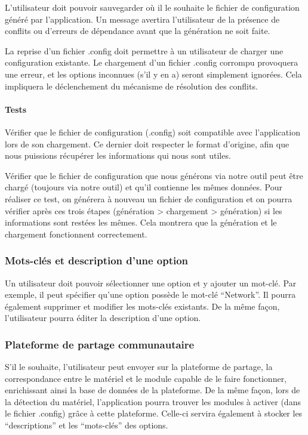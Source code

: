 \documentclass[16pts]{report}
\begin{document}
L’utilisateur doit pouvoir sauvegarder où il le souhaite le fichier de
configuration généré par l’application. Un message avertira l’utilisateur de la
présence de conflits ou d’erreurs de dépendance avant que la génération ne soit
faite.

La reprise d’un fichier .config doit permettre à un utilisateur de charger une
configuration existante. Le chargement d’un fichier .config corrompu provoquera
une erreur, et les options inconnues (s’il y en a) seront simplement ignorées.
Cela impliquera le déclenchement du mécanisme de résolution des conflits.

\paragraph{Tests}
\label{sub:Tests}

Vérifier que le fichier de configuration (.config) soit compatible avec
l’application lors de son chargement. Ce dernier doit respecter le format
d’origine, afin que nous puissions récupérer les informations qui nous sont
utiles.

Vérifier que le fichier de configuration que nous générons via notre outil
peut être chargé (toujours via notre outil) et qu’il contienne les mêmes
données. Pour réaliser ce test, on générera à nouveau un fichier de
configuration et on pourra vérifier après ces trois étapes (génération >
chargement > génération) si les informations sont restées les mêmes. Cela
montrera que la génération et le chargement fonctionnent correctement.


\subsubsection{Mots-clés et description d'une option}
\label{sec:Mots-clés et description d'une option}

Un utilisateur doit pouvoir sélectionner une option et y ajouter un mot-clé.
Par exemple, il peut spécifier qu’une option possède le mot-clé “Network”. Il
pourra également supprimer et modifier les mots-clés existants. De la même
façon, l’utilisateur pourra éditer la description d’une option.

\subsubsection{Plateforme de partage communautaire}
\label{sec:Plateforme de partage communautaire}

S’il le souhaite, l’utilisateur peut envoyer sur la plateforme de partage, la
correspondance entre le matériel et le module capable de le faire fonctionner,
enrichissant ainsi la base de données de la plateforme.  De la même façon, lors
de la détection du matériel, l’application pourra trouver les modules à activer
(dans le fichier .config) grâce à cette plateforme. Celle-ci servira également
à stocker les “descriptions” et les “mots-clés” des options.
\end{document}
